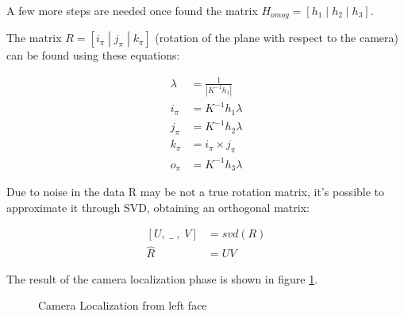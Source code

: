 \documentclass[11pt, oneside]{article}   	%
\begin{document}
A few more steps are needed once found the matrix $H_{omog} = [h_1\; |\; h_2\; |\; h_3]$. 

The matrix $R=[i_\pi\; | \; j_\pi \; | \; k_\pi]$ (rotation of the plane with respect to the camera) can be found using these equations:

\begin{subequations}
\begin{align*}
\lambda &= \frac{1}{|K^{-1}h_1|} \\
i_\pi &= K^{-1}h_1\lambda \\
j_\pi &= K^{-1}h_2\lambda \\
k_\pi &= i_\pi \times j_\pi  \\
o_\pi &= K^{-1} h_3 \lambda
\end{align*}
\end{subequations}

Due to noise in the data R may be not a true rotation matrix, it's possible to approximate it through SVD, obtaining an orthogonal matrix:

\begin{subequations}
\begin{align*}
[U,\; \_\;,\;V] &= svd(R) \\
\hat{R} &= UV
\end{align*}
\end{subequations}

The result of the camera localization phase is shown in figure \ref{left_loc}.

\begin{figure}
 \centering
    \qquad
    \caption{Camera Localization from left face}%
    \label{left_loc}%
\end{figure}
\end{document}
